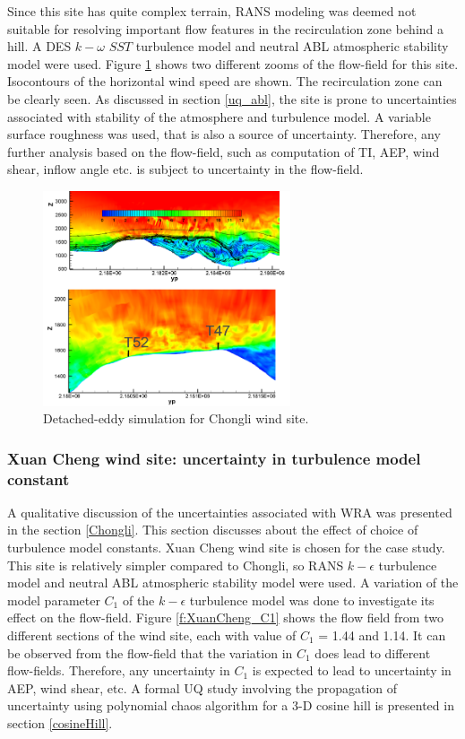 \documentclass[]{aiaa-tc}%
\begin{document}
Since this site has quite complex terrain, RANS modeling was deemed not suitable for resolving important flow features in the recirculation zone behind a hill. A DES  $k - \omega$  $SST$ turbulence model and neutral ABL atmospheric stability model were used. Figure \ref{f:DES_ComplexTerrain} shows two different zooms of the flow-field for this site. Isocontours of the horizontal wind speed are shown. The recirculation zone can be clearly seen. As discussed in section  \ref{uq_abl}, the site is prone to uncertainties associated with stability of the atmosphere and turbulence model. A variable surface roughness was used, that is also a source of uncertainty. Therefore, any further analysis based on the flow-field, such as computation of TI, AEP, wind shear, inflow angle etc. is subject to uncertainty in the flow-field.

\begin{figure}
\centering
 \includegraphics[width=0.65\textwidth]{DES_ComplexTerrain.png}
 \caption{Detached-eddy simulation for Chongli wind site.}
 \label{f:DES_ComplexTerrain}
\end{figure}

\subsubsection{Xuan Cheng wind site: uncertainty in turbulence model constant}

A qualitative discussion of the uncertainties associated with WRA was presented in the section \ref{Chongli}. This section discusses about the effect of choice of turbulence model constants. Xuan Cheng wind site is chosen for the case study. This site is relatively simpler compared to Chongli, so RANS $k - \epsilon$  turbulence model and neutral ABL atmospheric stability model were used. A variation of the model parameter $C_1$ of the $k - \epsilon$  turbulence model was done to investigate its effect on the flow-field. Figure \ref{f:XuanCheng_C1} shows the flow field from two different sections of the wind site, each with value of $C_1$ = 1.44 and 1.14. It can be observed from the flow-field that the variation in $C_1$ does lead to different flow-fields. Therefore, any uncertainty in $C_1$ is expected to lead to uncertainty in AEP, wind shear, etc. A formal UQ study involving the propagation of uncertainty using polynomial chaos algorithm for a 3-D cosine hill is presented in section \ref{cosineHill}.
\end{document}
